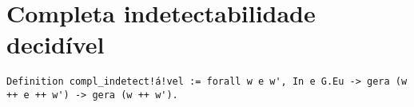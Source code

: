 \chapter{Completa indetectabilidade decidível}

\begin{verbatim}
Definition compl_indetect!á!vel := forall w e w', In e G.Eu -> gera (w ++ e ++ w') -> gera (w ++ w').
\end{verbatim}
